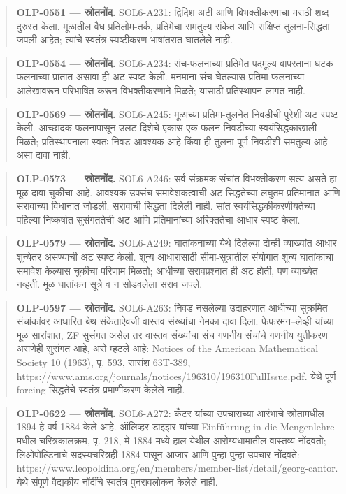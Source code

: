 \begin{quote}\small\textbf{OLP-0551 — स्रोतनोंद.} SOL6-A231: द्विदिश अटी आणि विभक्तीकरणाचा मराठी शब्द दुरुस्त केला. मूळातील वैध प्रतिलोम-तर्क, प्रतिमेचा समतुल्य संकेत आणि संक्षिप्त तुलना-सिद्धता जपली आहेत; त्यांचे स्वतंत्र स्पष्टीकरण भाषांतरात घातलेले नाही.\end{quote}
\begin{quote}\small\textbf{OLP-0554 — स्रोतनोंद.} SOL6-A234: संच-फलनाच्या प्रतिमेत पदमूल्य वापरताना घटक फलनाच्या प्रांतात असावा ही अट स्पष्ट केली. मनमाना संच घेतल्यास प्रतिमा फलनाच्या आलेखावरून परिभाषित करून विभक्तीकरणाने मिळते; यासाठी प्रतिस्थापन लागत नाही.\end{quote}
\begin{quote}\small\textbf{OLP-0569 — स्रोतनोंद.} SOL6-A245: मूळाच्या प्रतिमा-तुलनेत निवडीची पुरेशी अट स्पष्ट केली. आच्छादक फलनापासून उलट दिशेचे एकास-एक फलन निवडीच्या स्वयंसिद्धकाखाली मिळते; प्रतिस्थापनाला स्वतः निवड आवश्यक आहे किंवा ही तुलना पूर्ण निवडीशी समतुल्य आहे असा दावा नाही.\end{quote}
\begin{quote}\small\textbf{OLP-0573 — स्रोतनोंद.} SOL6-A246: सर्व संक्रमक संचांत विभक्तीकरण सत्य असते हा मूळ दावा चुकीचा आहे. आवश्यक उपसंच-समावेशकत्वाची अट सिद्धतेच्या लघुतम प्रतिमानात आणि सरावाच्या विधानात जोडली. सरावाची सिद्धता दिलेली नाही. सांत स्वयंसिद्धकीकरणीयतेच्या पहिल्या निष्कर्षात सुसंगततेची अट आणि प्रतिमानांच्या अरिक्ततेचा आधार स्पष्ट केला.\end{quote}
\begin{quote}\small\textbf{OLP-0579 — स्रोतनोंद.} SOL6-A249: घातांकनाच्या येथे दिलेल्या दोन्ही व्याख्यांत आधार शून्येतर असण्याची अट स्पष्ट केली. शून्य आधारासाठी सीमा-सूत्रातील संयोगात शून्य घातांकाचा समावेश केल्यास चुकीचा परिणाम मिळतो; आधीच्या सरावप्रश्नात ही अट होती, पण व्याख्येत नव्हती. मूळ घातांकन सूत्रे व न सोडवलेला सराव जपले.\end{quote}
\begin{quote}\small\textbf{OLP-0597 — स्रोतनोंद.} SOL6-A263: निवड नसलेल्या उदाहरणात आधीच्या सुक्रमित संचांकांवर आधारित बेथ संकेताऐवजी वास्तव संख्यांचा नेमका दावा दिला. फेफरमन–लेव्ही यांच्या मूळ सारांशात, ZF सुसंगत असेल तर वास्तव संख्यांचा संच गणनीय संचांचे गणनीय युतीकरण असणेही सुसंगत आहे, असे म्हटले आहे: Notices of the American Mathematical Society 10 (1963), पृ. 593, सारांश 63T-389, https://www.ams.org/journals/notices/196310/196310FullIssue.pdf. येथे पूर्ण forcing सिद्धतेचे स्वतंत्र प्रमाणीकरण केलेले नाही.\end{quote}
\begin{quote}\small\textbf{OLP-0622 — स्रोतनोंद.} SOL6-A272: कँटर यांच्या उपचाराच्या आरंभाचे स्रोतामधील 1894 हे वर्ष 1884 केले आहे. ऑलिव्हर डाइझर यांच्या Einführung in die Mengenlehre मधील चरित्रकालक्रम, पृ. 218, मे 1884 मध्ये हाल येथील आरोग्यधामातील वास्तव्य नोंदवतो; लिओपोल्डिनाचे सदस्यचरित्रही 1884 पासून आजार आणि पुन्हा पुन्हा उपचार नोंदवते: https://www.leopoldina.org/en/members/member-list/detail/georg-cantor. येथे संपूर्ण वैद्यकीय नोंदींचे स्वतंत्र पुनरावलोकन केलेले नाही.\end{quote}

